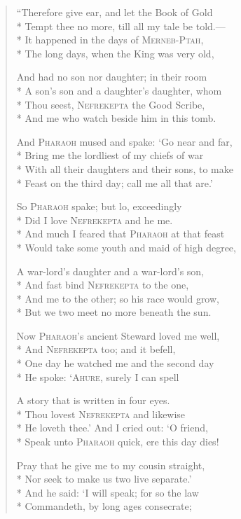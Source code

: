 \documentclass[12pt]{article}
\newcommand{\vin}{\hspace{1em}}
\begin{document}
\begin{verse}
``Therefore give ear, and let the Book of Gold\\*
Tempt thee no more, till all my tale be told.---\\*
\vin It happened in the days of \textsc{Merneb-Ptah},\\*
The long days, when the King was very old,

And had no son nor daughter; in their room\\*
A son's son and a daughter's daughter, whom\\*
\vin Thou seest, \textsc{Nefrekepta} the Good Scribe,\\*
And me who watch beside him in this tomb.

And \textsc{Pharaoh} mused and spake: `Go near and far,\\*
Bring me the lordliest of my chiefs of war\\*
\vin With all their daughters and their sons, to make\\*
Feast on the third day; call me all that are.'

So \textsc{Pharaoh} spake; but lo, exceedingly\\*
Did I love \textsc{Nefrekepta} and he me.\\*
\vin And much I feared that \textsc{Pharaoh} at that feast\\*
Would take some youth and maid of high degree,

A war-lord's daughter and a war-lord's son,\\*
And fast bind \textsc{Nefrekepta} to the one,\\*
\vin And me to the other; so his race would grow,\\*
But we two meet no more beneath the sun.

Now \textsc{Pharaoh}'s ancient Steward loved me well,\\*
And \textsc{Nefrekepta} too; and it befell,\\*
\vin One day he watched me and the second day\\*
He spoke: `\textsc{Ahure}, surely I can spell

A story that is written in four eyes.\\*
Thou lovest \textsc{Nefrekepta} and likewise\\*
\vin He loveth thee.' And I cried out: `O friend,\\*
Speak unto \textsc{Pharaoh} quick, ere this day dies!

Pray that he give me to my cousin straight,\\*
Nor seek to make us two live separate.'\\*
\vin And he said: `I will speak; for so the law\\*
Commandeth, by long ages consecrate;


\end{verse}
\end{document}
